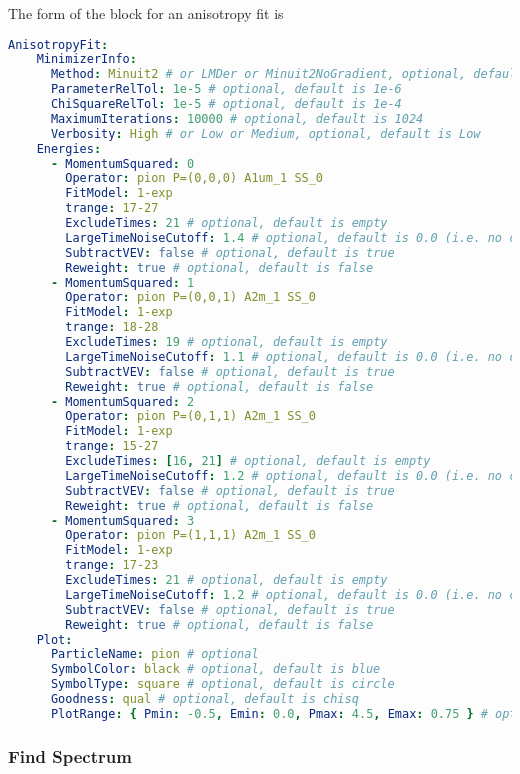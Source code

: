 \documentclass[12pt,letterpaper,notitlepage]{article}
\begin{document}
The form of the block for an anisotropy fit is
\begin{lstlisting}[language=yaml]
  AnisotropyFit:
    MinimizerInfo:
      Method: Minuit2 # or LMDer or Minuit2NoGradient, optional, default is LMDer
      ParameterRelTol: 1e-5 # optional, default is 1e-6
      ChiSquareRelTol: 1e-5 # optional, default is 1e-4
      MaximumIterations: 10000 # optional, default is 1024
      Verbosity: High # or Low or Medium, optional, default is Low
    Energies:
      - MomentumSquared: 0
        Operator: pion P=(0,0,0) A1um_1 SS_0
        FitModel: 1-exp
        trange: 17-27
        ExcludeTimes: 21 # optional, default is empty
        LargeTimeNoiseCutoff: 1.4 # optional, default is 0.0 (i.e. no cutoff)
        SubtractVEV: false # optional, default is true
        Reweight: true # optional, default is false
      - MomentumSquared: 1
        Operator: pion P=(0,0,1) A2m_1 SS_0
        FitModel: 1-exp
        trange: 18-28
        ExcludeTimes: 19 # optional, default is empty
        LargeTimeNoiseCutoff: 1.1 # optional, default is 0.0 (i.e. no cutoff)
        SubtractVEV: false # optional, default is true
        Reweight: true # optional, default is false
      - MomentumSquared: 2
        Operator: pion P=(0,1,1) A2m_1 SS_0
        FitModel: 1-exp
        trange: 15-27
        ExcludeTimes: [16, 21] # optional, default is empty
        LargeTimeNoiseCutoff: 1.2 # optional, default is 0.0 (i.e. no cutoff)
        SubtractVEV: false # optional, default is true
        Reweight: true # optional, default is false
      - MomentumSquared: 3
        Operator: pion P=(1,1,1) A2m_1 SS_0
        FitModel: 1-exp
        trange: 17-23
        ExcludeTimes: 21 # optional, default is empty
        LargeTimeNoiseCutoff: 1.2 # optional, default is 0.0 (i.e. no cutoff)
        SubtractVEV: false # optional, default is true
        Reweight: true # optional, default is false
    Plot:
      ParticleName: pion # optional
      SymbolColor: black # optional, default is blue
      SymbolType: square # optional, default is circle
      Goodness: qual # optional, default is chisq
      PlotRange: { Pmin: -0.5, Emin: 0.0, Pmax: 4.5, Emax: 0.75 } # optional
\end{lstlisting}

\subsubsection{Find Spectrum}
\end{document}
